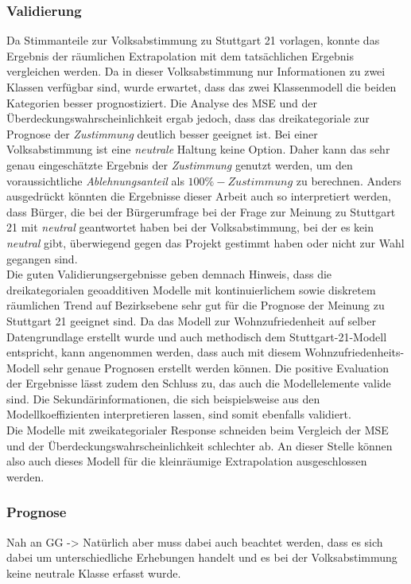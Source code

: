 \documentclass{Vorlage}
\begin{document}
\subsubsection{Validierung}
Da Stimmanteile zur Volksabstimmung zu Stuttgart 21 vorlagen, konnte das Ergebnis der räumlichen Extrapolation mit dem tatsächlichen Ergebnis vergleichen werden.
Da in dieser Volksabstimmung nur Informationen zu zwei Klassen verfügbar sind, wurde erwartet, dass das zwei Klassenmodell die beiden Kategorien besser prognostiziert. Die Analyse des MSE und der Überdeckungswahrscheinlichkeit ergab jedoch, dass das dreikategoriale zur Prognose der \textit{Zustimmung} deutlich besser geeignet ist. Bei einer Volksabstimmung ist eine \textit{neutrale} Haltung keine Option. Daher kann das sehr genau eingeschätzte Ergebnis der \textit{Zustimmung} genutzt werden, um den voraussichtliche \textit{Ablehnungsanteil} als $100\% -\textit{Zustimmung}$ zu berechnen. Anders ausgedrückt könnten die Ergebnisse dieser Arbeit auch so interpretiert werden, dass Bürger, die bei der Bürgerumfrage bei der Frage zur Meinung zu Stuttgart 21 mit \textit{neutral} geantwortet haben bei der Volksabstimmung, bei der es kein \textit{neutral} gibt, überwiegend gegen das Projekt gestimmt haben oder nicht zur Wahl gegangen sind.\\
Die guten Validierungsergebnisse geben demnach Hinweis, dass die dreikategorialen geoadditiven Modelle mit kontinuierlichem sowie diskretem räumlichen Trend auf Bezirksebene sehr gut für die Prognose der Meinung zu Stuttgart 21 geeignet sind. Da das Modell zur Wohnzufriedenheit auf selber Datengrundlage erstellt wurde und auch methodisch dem Stuttgart-21-Modell entspricht, kann angenommen werden, dass auch mit diesem Wohnzufriedenheits-Modell sehr genaue Prognosen erstellt werden können. Die positive Evaluation der Ergebnisse lässt zudem den Schluss zu, das auch die Modellelemente valide sind. Die Sekundärinformationen, die sich beispielsweise aus den Modellkoeffizienten interpretieren lassen, sind somit ebenfalls validiert.\\
Die Modelle mit zweikategorialer Response schneiden beim Vergleich der MSE und der Über\-deckungs\-wahrscheinlichkeit schlechter ab. An dieser Stelle können also auch dieses Modell für die kleinräumige Extrapolation ausgeschlossen werden.

\subsubsection{Prognose}
Nah an GG ->
 Natürlich aber muss dabei auch beachtet werden, dass es sich dabei um unterschiedliche Erhebungen handelt und es bei der Volksabstimmung keine neutrale Klasse erfasst wurde.\\
\end{document}
